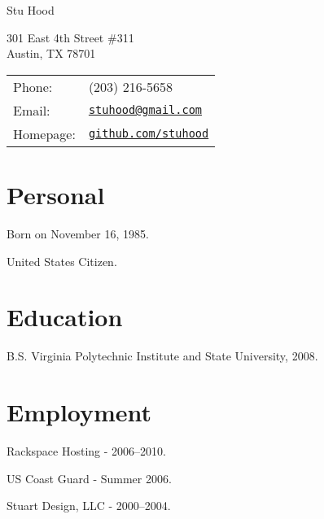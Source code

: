 \documentclass[letterpaper]{article}
\def\name{Stu Hood}
\renewenvironment{itemize}{
  \begin{list}{}{
    \setlength{\leftmargin}{1.5em}
  }
}{
  \end{list}
}
\begin{document}
{\huge \name}


\vspace{0.25in}

\begin{minipage}{0.45\linewidth}
  301 East 4th Street \#311 \\
  Austin, TX 78701
\end{minipage}
\begin{minipage}{0.45\linewidth}
  \begin{tabular}{ll}
    Phone: & (203) 216-5658 \\
    Email: & \href{mailto:stuhood@gmail.com}{\tt stuhood@gmail.com} \\
    Homepage: & \href{http://www.github.com/stuhood/}{\tt github.com/stuhood} \\
  \end{tabular}
\end{minipage}


\section*{Personal}

\begin{itemize}
  \item Born on November 16, 1985.
  \item United States Citizen.
\end{itemize}


\section*{Education}

\begin{itemize}
  \item B.S. Virginia Polytechnic Institute and State University, 2008.
\end{itemize}


\section*{Employment}

\begin{itemize}
  \item Rackspace Hosting - 2006--2010.
  \item US Coast Guard - Summer 2006.
  \item Stuart Design, LLC - 2000--2004.
\end{itemize}
\end{document}
